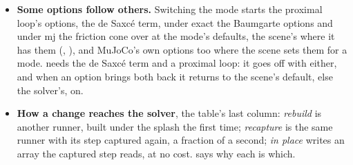 \begin{itemize}
\item \textbf{Some options follow others.} Switching the mode starts the proximal loop's options, the de Saxcé term, under exact the Baumgarte options and under mj the friction cone over at the mode's defaults, the scene's where it has them (, ), and MuJoCo's own options too where the scene sets them for a mode.  needs the de Saxcé term and a proximal loop: it goes off with either, and when an option brings both back it returns to the scene's default, else the solver's, on.
\item \textbf{How a change reaches the solver}, the table's last column: \emph{rebuild} is another runner, built under the splash the first time; \emph{recapture} is the same runner with its step captured again, a fraction of a second; \emph{in place} writes an array the captured step reads, at no cost.  says why each is which.
\end{itemize}

